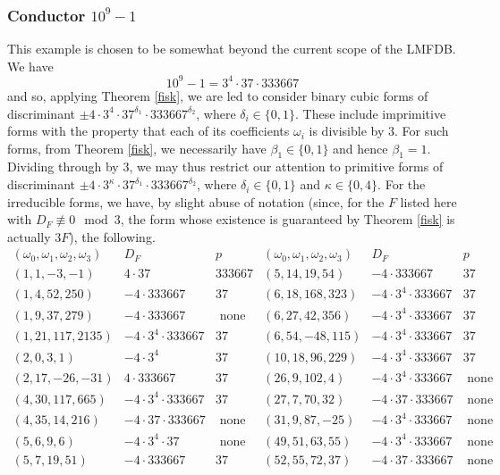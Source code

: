 \subsubsection{Conductor $10^9-1$}  \label{exe3}
 
This example is chosen to be somewhat beyond the current scope of the LMFDB.
We have
$$
10^9-1 = 3^4 \cdot 37 \cdot 333667
$$
and so, applying Theorem \ref{fisk}, we are led to consider binary cubic forms of discriminant $\pm 4 \cdot 3^4 \cdot 37^{\delta_1} \cdot 333667^{\delta_2}$, where $\delta_i \in \{ 0, 1 \}$. These include imprimitive forms with the property that each of its coefficients $\omega_i$ is divisible by $3$. For such forms, from Theorem \ref{fisk}, we necessarily have $\beta_1 \in \{ 0, 1 \}$ and hence $\beta_1=1$. Dividing through by $3$, we may thus 
restrict our attention to primitive forms of discriminant $\pm 4 \cdot 3^\kappa \cdot 37^{\delta_1} \cdot 333667^{\delta_2}$, where $\delta_i \in \{ 0, 1 \}$
 and $\kappa \in \{ 0, 4 \}$.
For the irreducible forms, we have, by slight abuse of notation (since, for the $F$ listed here with $D_F \not\equiv 0 \mod{3}$, the form whose existence is guaranteed by Theorem \ref{fisk} is actually $3F$), the following.
$$
\begin{array}{ccc|ccc} 
(\omega_0,\omega_1,\omega_2,\omega_3) & D_F & p & (\omega_0,\omega_1,\omega_2,\omega_3)  & D_F & p \\ \hline
(1,1,-3,-1) & 4 \cdot 37 & 333667 & (5,14,19,54) &  -4 \cdot 333667 & 37 \\
(1,4,52,250) & -4 \cdot 333667 & 37 & (6,18,168,323) & -4 \cdot 3^4 \cdot 333667 & 37 \\
(1,9,37,279) & -4 \cdot 333667 &   \mbox{ none } & (6,27,42,356) & -4 \cdot 3^4 \cdot 333667 & 37 \\
(1,21,117,2135) & -4 \cdot 3^4 \cdot 333667 & 37 & (6,54,-48,115) & -4 \cdot 3^4 \cdot 333667 & 37 \\
(2,0,3,1) & -4 \cdot 3^4 & 37 & (10,18,96,229) &  -4 \cdot 3^4 \cdot 333667 & 37 \\
(2,17,-26,-31) & 4 \cdot 333667 & 37 & (26,9,102,4) & -4 \cdot 3^4 \cdot 333667 & \mbox{ none } \\
(4,30,117,665) & -4 \cdot 3^4 \cdot 333667 & 37 & (27,7,70,32) & -4 \cdot 37 \cdot 333667 & \mbox{ none } \\
(4,35,14,216) & -4 \cdot 37 \cdot 333667 & \mbox{ none } & (31,9,87,-25) & -4 \cdot 3^4 \cdot 333667 & \mbox{ none } \\
(5,6,9,6) & -4 \cdot 3^4 \cdot 37 & \mbox{ none } & (49,51,63,55) & -4 \cdot 3^4 \cdot 333667  & \mbox{ none } \\ 
(5,7,19,51) & -4 \cdot 333667 & 37 & (52,55,72,37) & -4 \cdot 37 \cdot 333667 & \mbox{ none } \\
\end{array}
$$
